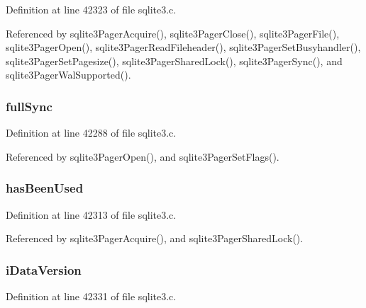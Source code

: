 Definition at line 42323 of file sqlite3.\+c.



Referenced by sqlite3\+Pager\+Acquire(), sqlite3\+Pager\+Close(), sqlite3\+Pager\+File(), sqlite3\+Pager\+Open(), sqlite3\+Pager\+Read\+Fileheader(), sqlite3\+Pager\+Set\+Busyhandler(), sqlite3\+Pager\+Set\+Pagesize(), sqlite3\+Pager\+Shared\+Lock(), sqlite3\+Pager\+Sync(), and sqlite3\+Pager\+Wal\+Supported().

\hypertarget{struct_pager_ae32bce1abb3f600be3349121c138deb6}{}
\subsubsection[{full\+Sync}]{ full\+Sync}\label{struct_pager_ae32bce1abb3f600be3349121c138deb6}


Definition at line 42288 of file sqlite3.\+c.



Referenced by sqlite3\+Pager\+Open(), and sqlite3\+Pager\+Set\+Flags().

\hypertarget{struct_pager_a43faa7e49512287f2f833498014d2f95}{}
\subsubsection[{has\+Been\+Used}]{ has\+Been\+Used}\label{struct_pager_a43faa7e49512287f2f833498014d2f95}


Definition at line 42313 of file sqlite3.\+c.



Referenced by sqlite3\+Pager\+Acquire(), and sqlite3\+Pager\+Shared\+Lock().

\hypertarget{struct_pager_a3a60e67667c7473065ef0c3a8785c6ea}{}
\subsubsection[{i\+Data\+Version}]{ i\+Data\+Version}\label{struct_pager_a3a60e67667c7473065ef0c3a8785c6ea}


Definition at line 42331 of file sqlite3.\+c.



